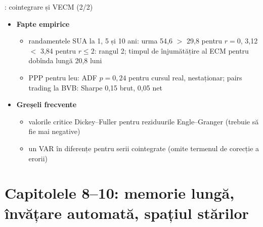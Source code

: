 \begin{frame}{: cointegrare și VECM (2/2)}
\itemsize{\footnotesize}
\begin{itemize}
    \item \textbf{Fapte empirice}
    \begin{itemize}
        \item randamentele SUA la 1, 5 și 10 ani: urma 54{,}6 $>$ 29{,}8 pentru $r = 0$, 3{,}12 $<$ 3{,}84 pentru $r \le 2$: rangul 2; timpul de înjumătățire al ECM pentru dobînda lungă 20{,}8 luni
        \item PPP pentru leu: ADF $p = 0{,}24$ pentru cursul real, nestaționar; pairs trading la BVB: Sharpe 0{,}15 brut, 0{,}05 net
    \end{itemize}
    \item \textbf{Greșeli frecvente}
    \begin{itemize}
        \item valorile critice Dickey--Fuller pentru reziduurile Engle--Granger (trebuie să fie mai negative)
        \item un VAR în diferențe pentru serii cointegrate (omite termenul de corecție a erorii)
    \end{itemize}
\end{itemize}
\end{frame}


\section{Capitolele 8--10: memorie lungă, învățare automată, spațiul stărilor}

